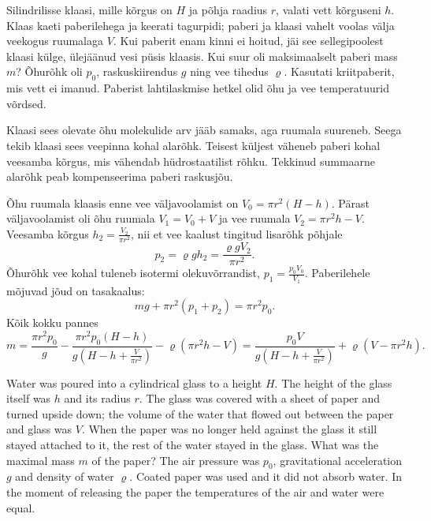 
Silindrilisse klaasi, mille kõrgus on $H$ ja põhja raadius $r$, valati
vett kõrguseni $h$. Klaas kaeti paberilehega ja keerati
tagurpidi; paberi ja
klaasi vahelt voolas välja veekogus ruumalaga $V$. Kui paberit enam kinni ei
hoitud, jäi see sellegipoolest klaasi külge, ülejäänud vesi püsis klaasis.
Kui suur oli maksimaalselt paberi mass $m$? Õhurõhk oli $p_0$,
raskuskiirendus $g$ ning vee tihedus $\varrho$.
Kasutati kriitpaberit, mis vett ei imanud. Paberist lahtilaskmise hetkel olid 
õhu ja vee temperatuurid võrdsed.

\hint
Klaasi sees olevate õhu molekulide arv jääb samaks, aga ruumala suureneb. Seega tekib klaasi sees veepinna kohal alarõhk. Teisest küljest väheneb paberi kohal veesamba kõrgus, mis vähendab hüdrostaatilist rõhku. Tekkinud summaarne alarõhk peab kompenseerima paberi raskusjõu.

\solu
Õhu ruumala klaasis enne vee väljavoolamist on 
$V_0 = \pi r^2 (H-h)$.
Pärast väljavoolamist oli õhu ruumala
$V_1 = V_0 + V$
ja vee ruumala
$V_2 = \pi r^2 h - V$.
Veesamba kõrgus
$h_2 = \frac{ V_2 }{ \pi r^2 }$,
nii et vee kaalust tingitud lisarõhk põhjale
\[
p_2 = \varrho g h_2 = \frac{ \varrho g V_2 }{ \pi r^2 }.
\]
Õhurõhk vee kohal tuleneb isotermi olekuvõrrandist,
$p_1 = \frac{p_0 V_0}{V_1}$.
Paberilehele mõjuvad jõud on tasakaalus:
\[
mg + \pi r^2 (p_1 + p_2) = \pi r^2 p_0.
\]
Kõik kokku pannes
\[ m =
\frac{ \pi r^2 p_0 }{ g } -
\frac{ \pi r^2 p_0 (H-h) }{ g \left( H - h + \frac{V}{\pi r^2} \right) } -
\varrho \left( \pi r^2 h - V \right)
=
\frac{ p_0 V }{ g \left( H - h + \frac{V}{ \pi r^2 } \right) } + \varrho \left( V - \pi r^2 h \right).
\]

Water was poured into a cylindrical glass to a height $H$. The height of the glass itself was $h$ and its radius $r$. The glass was covered with a sheet of paper and turned upside down; the volume of the water that flowed out between the paper and glass was $V$. When the paper was no longer held against the glass it still stayed attached to it, the rest of the water stayed in the glass. What was the maximal mass $m$ of the paper? The air pressure was $p_0$, gravitational acceleration $g$ and density of water $\varrho$. Coated paper was used and it did not absorb water. In the moment of releasing the paper the temperatures of the air and water were equal.

